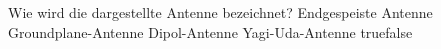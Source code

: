     {Wie wird die dargestellte Antenne bezeichnet?}
    {Endgespeiste Antenne}
    {Groundplane-Antenne}
    {Dipol-Antenne}
    {Yagi-Uda-Antenne}
    {true}{false}